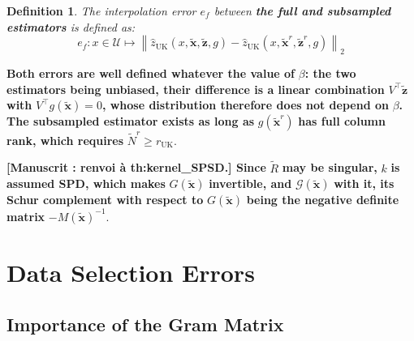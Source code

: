 \documentclass[preprint]{elsarticle}
\newtheorem{definition}{Definition}
\begin{document}
\begin{definition}
    The interpolation error $e_f$ between \textbf{the full and subsampled estimators} is defined as:
    \begin{equation*}
        e_f:x\in\mathcal{U}\mapsto\left\|\hat{z}_{\mathrm{UK}}(x,\tilde{\mathbf{x}},\tilde{\mathbf{z}},g)-\hat{z}_{\mathrm{UK}}(x,\tilde{\mathbf{x}}^r,\tilde{\mathbf{z}}^r,g)\right\|_2
    \end{equation*}\label{def:L1_error}
    \vspace{-\baselineskip}
\end{definition}

\textbf{Both errors are well defined whatever the value of} $\beta$\textbf{: the two estimators being unbiased, their difference is a linear combination} $V^\top\tilde{\mathbf{z}}$ \textbf{with} $V^\top g(\tilde{\mathbf{x}})=0$\textbf{, whose distribution therefore does not depend on} $\beta$\textbf{. The subsampled estimator exists as long as} $g(\tilde{\mathbf{x}}^r)$ \textbf{has full column rank, which requires} $\tilde{N}^r\geq r_{\mathrm{UK}}$.

\textbf{[Manuscrit : renvoi à th:kernel\_SPSD.] Since} $\tilde{R}$ \textbf{may be singular,} $k$ \textbf{is assumed SPD, which makes} $G(\tilde{\mathbf{x}})$ \textbf{invertible, and} $\mathcal{G}(\tilde{\mathbf{x}})$ \textbf{with it, its Schur complement with respect to} $G(\tilde{\mathbf{x}})$ \textbf{being the negative definite matrix} $-M(\tilde{\mathbf{x}})^{-1}$.

\section{Data Selection Errors}\label{sec:data_selection}

\subsection{Importance of the Gram Matrix}
\end{document}
